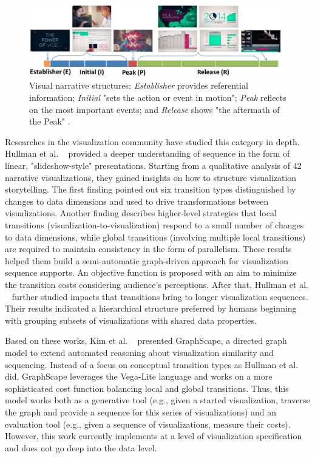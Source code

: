 \begin{figure}[htb]
	\centering 
	\includegraphics[width=0.98\textwidth]{figure/sequence1.png} 
	\caption{Visual narrative structures: \textit{Establisher} provides referential information; \textit{Initial} "sets the action or event in motion"; \textit{Peak} reflects on the most important events; and \textit{Release} shows "the aftermath of the Peak" \cite{Amini2015}. } 
	\label{sequence1} 
\end{figure}

Researches in the visualization community have studied this category in depth. Hullman et al. ~\cite{Hullman2013a} provided a deeper understanding of sequence in the form of linear, "slideshow-style" presentations. Starting from a qualitative analysis of 42 narrative visualizations, they gained insights on how to structure visualization storytelling. The first finding pointed out six transition types distinguished by changes to data dimensions and used to drive transformations between visualizations.  Another finding describes higher-level strategies that local transitions (visualization-to-visualization) respond to a small number of changes to data dimensions, while global transitions (involving multiple local transitions) are required to maintain consistency in the form of parallelism. These results helped them build a semi-automatic graph-driven approach for visualization sequence supports. An objective function is proposed with an aim to minimize the transition costs considering audience's perceptions. After that, Hullman et al. ~\cite{Hullman2017} further studied impacts that transitions bring to longer visualization sequences. Their results indicated a hierarchical structure preferred by humans beginning with grouping subsets of visualizations with shared data properties.

Based on these works, Kim et al. ~\cite{Kim2017a} presented GraphScape, a directed graph model to extend automated reasoning about visualization similarity and sequencing. Instead of a focus on conceptual transition types as Hullman et al. did, GraphScape leverages the Vega-Lite language and works on a more sophisticated cost function balancing local and global transitions. Thus, this model works both as a generative tool (e.g., given a started visualization, traverse the graph and provide a sequence for this series of visualizations) and an evaluation tool (e.g., given a sequence of visualizations, measure their costs). However, this work currently implements at a level of visualization specification and does not go deep into the data level. 

